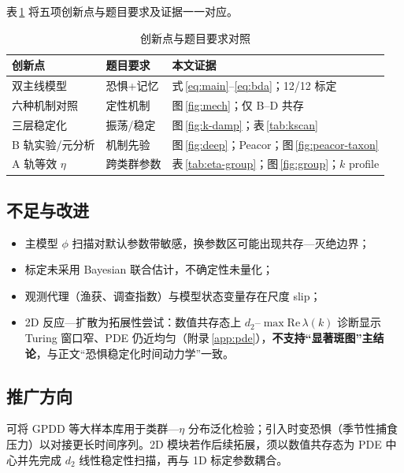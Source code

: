 \documentclass[12pt,a4paper]{ctexart}
\begin{document}
表\,\ref{tab:innovation-map} 将五项创新点与题目要求及证据一一对应。

\begin{table}[H]
  \centering
  \caption{创新点与题目要求对照}
  \label{tab:innovation-map}
  \small
  \begin{tabular}{p{3.2cm}p{4.2cm}p{5.8cm}}
    \toprule
    创新点 & 题目要求 & 本文证据 \\
    \midrule
    双主线模型 & 恐惧+记忆 & 式\,\eqref{eq:main}--\eqref{eq:bda}；12/12 标定 \\
    六种机制对照 & 定性机制 & 图\,\ref{fig:mech}；仅 B--D 共存 \\
    三层稳定化 & 振荡/稳定 & 图\,\ref{fig:k-damp}；表\,\ref{tab:kscan} \\
    B 轨实验/元分析 & 机制先验 & 图\,\ref{fig:deep}；Peacor；图\,\ref{fig:peacor-taxon} \\
    A 轨等效 $\eta$ & 跨类群参数 & 表\,\ref{tab:eta-group}；图\,\ref{fig:group}；$k$ profile \\
    \bottomrule
  \end{tabular}
\end{table}

\subsection{不足与改进}

\begin{itemize}[leftmargin=2em]
  \item 主模型 $\phi$ 扫描对默认参数带敏感，换参数区可能出现共存—灭绝边界；
  \item 标定未采用 Bayesian 联合估计，不确定性未量化；
  \item 观测代理（渔获、调查指数）与模型状态变量存在尺度 slip；
  \item 2D 反应—扩散为拓展性尝试：数值共存态上 $d_2$--$\max\mathrm{Re}\,\lambda(k)$ 诊断显示 Turing 窗口窄、PDE 仍近均匀（附录\,\ref{app:pde}），\textbf{不支持“显著斑图”主结论}，与正文“恐惧稳定化时间动力学”一致。
\end{itemize}

\subsection{推广方向}

可将 GPDD 等大样本库用于类群—$\eta$ 分布泛化检验；引入时变恐惧（季节性捕食压力）以对接更长时间序列。2D 模块若作后续拓展，须以数值共存态为 PDE 中心并先完成 $d_2$ 线性稳定性扫描，再与 1D 标定参数耦合。
\end{document}
